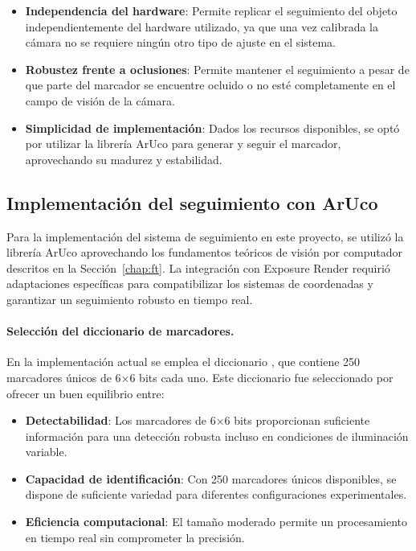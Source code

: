 \begin{itemize}
    \item \textbf{Independencia del hardware}: Permite replicar el seguimiento del objeto independientemente del hardware utilizado, ya que una vez calibrada la cámara no se requiere ningún otro tipo de ajuste en el sistema.
    \item \textbf{Robustez frente a oclusiones}: Permite mantener el seguimiento a pesar de que parte del marcador se encuentre ocluido o no esté completamente en el campo de visión de la cámara.
    \item \textbf{Simplicidad de implementación}: Dados los recursos disponibles, se optó por utilizar la librería ArUco para generar y seguir el marcador, aprovechando su madurez y estabilidad.
\end{itemize}

\subsection{Implementación del seguimiento con ArUco}

Para la implementación del sistema de seguimiento en este proyecto, se utilizó la librería ArUco aprovechando los fundamentos teóricos de visión por computador descritos en la Sección~\ref{chap:ft}. La integración con Exposure Render requirió adaptaciones específicas para compatibilizar los sistemas de coordenadas y garantizar un seguimiento robusto en tiempo real.

\paragraph{Selección del diccionario de marcadores.}
En la implementación actual se emplea el diccionario , que contiene 250 marcadores únicos de 6×6 bits cada uno. Este diccionario fue seleccionado por ofrecer un buen equilibrio entre:

\begin{itemize}
	\item \textbf{Detectabilidad}: Los marcadores de 6×6 bits proporcionan suficiente información para una detección robusta incluso en condiciones de iluminación variable.
	\item \textbf{Capacidad de identificación}: Con 250 marcadores únicos disponibles, se dispone de suficiente variedad para diferentes configuraciones experimentales.
	\item \textbf{Eficiencia computacional}: El tamaño moderado permite un procesamiento en tiempo real sin comprometer la precisión.
\end{itemize}

